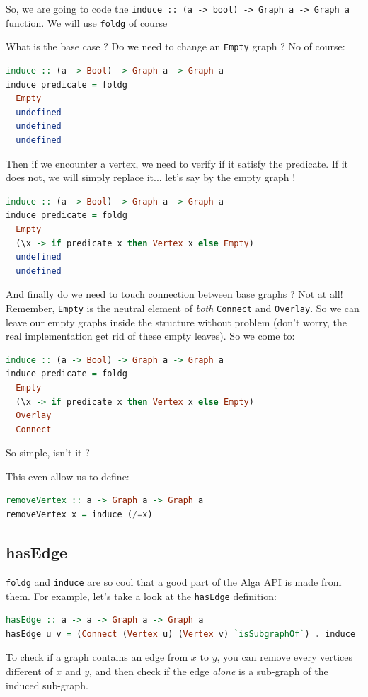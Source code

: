\documentclass[10pt,a4paper]{article}
\begin{document}
So, we are going to code the \verb|induce :: (a -> bool) -> Graph a -> Graph a| function. We will use \verb|foldg| of course

What is the base case ? Do we need to change an \verb|Empty| graph ? No of course:

\begin{lstlisting}[language=Haskell, frame=single]
induce :: (a -> Bool) -> Graph a -> Graph a
induce predicate = foldg
  Empty 
  undefined
  undefined
  undefined
\end{lstlisting}

Then if we encounter a vertex, we need to verify if it satisfy the predicate. If it does not, we will simply replace it... let's say by the empty graph !

\begin{lstlisting}[language=Haskell, frame=single]
induce :: (a -> Bool) -> Graph a -> Graph a
induce predicate = foldg 
  Empty
  (\x -> if predicate x then Vertex x else Empty)
  undefined
  undefined
\end{lstlisting}
 
And finally do we need to touch connection between base graphs ? Not at all! Remember, \verb|Empty| is the neutral element of \emph{both} \verb|Connect| and \verb|Overlay|. So we can leave our empty graphs inside the structure without problem (don't worry, the real implementation get rid of these empty leaves). So we come to:

\begin{lstlisting}[language=Haskell, frame=single]
induce :: (a -> Bool) -> Graph a -> Graph a
induce predicate = foldg 
  Empty 
  (\x -> if predicate x then Vertex x else Empty)
  Overlay
  Connect
\end{lstlisting}

So simple, isn't it ?
 
This even allow us to define:

\begin{lstlisting}[language=Haskell, frame=single]
removeVertex :: a -> Graph a -> Graph a
removeVertex x = induce (/=x)
\end{lstlisting}

\subsection{hasEdge}
\verb|foldg| and \verb|induce| are so cool that a good part of the Alga API is made from them. For example, let's take a look at the \verb|hasEdge| definition:
\begin{lstlisting}[language=Haskell, frame=single]
hasEdge :: a -> a -> Graph a -> Graph a
hasEdge u v = (Connect (Vertex u) (Vertex v) `isSubgraphOf`) . induce (`elem` [u, v])
\end{lstlisting}
To check if a graph contains an edge from $x$ to $y$, you can remove every vertices different of $x$ and $y$, and then check if the edge \emph{alone} is a sub-graph of the induced sub-graph.
\end{document}
